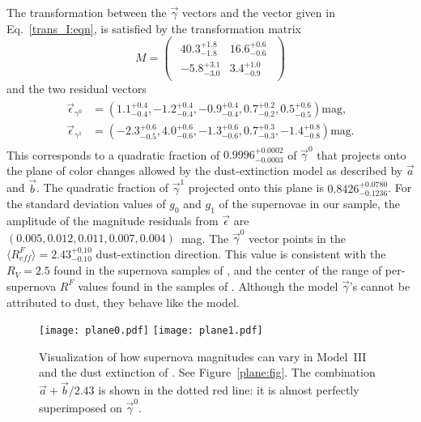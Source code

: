 \documentclass[trackchanges]{aastex62}   	%
\begin{document}
The transformation between the $\vec{\gamma}$  vectors and the    vector given in
Eq.~\ref{trans_I:eqn}, is satisfied by the transformation matrix
\begin{equation}
M=
\begin{pmatrix}
\begin{array}{rr}
40.3^{+1.8}_{-1.8} & 16.6^{+0.6}_{-0.6} \\
-5.8^{+3.1}_{-3.0} & 3.4^{+1.0}_{-0.9}
\end{array}
\end{pmatrix} 
\end{equation}
and the two residual vectors
\begin{align}
\begin{split}
\vec{\epsilon}_{\gamma^0} &=\left(1.1^{+0.4}_{-0.4} , -1.2^{+0.4}_{-0.4} , -0.9^{+0.4}_{-0.4} , 0.7^{+0.2}_{-0.2} , 0.5^{+0.6}_{-0.5}\right) \text{mag}, \\
\vec{\epsilon}_{\gamma^1} & =\left(-2.3^{+0.6}_{-0.5} , 4.0^{+0.6}_{-0.6} , -1.3^{+0.6}_{-0.6} , 0.7^{+0.3}_{-0.3} , -1.4^{+0.8}_{-0.8}\right) \text{mag}.
\end{split}
\label{res_3:eqn}
\end{align}
This corresponds to a quadratic fraction of $0.9996^{+0.0002}_{-0.0003}$ of $\vec{\gamma}^0$ that projects onto the plane of
color changes allowed by the  dust-extinction model
as described by
$\vec{a}$ and $\vec{b}$. The quadratic fraction of $\vec{\gamma}^1$ projected
onto this plane is
$0.8426^{+0.0780}_{-0.1236}$.
For the standard deviation values of $g_0$ and $g_1$ of the supernovae in our sample, the amplitude of the magnitude residuals from $\vec{\epsilon}$ are 
$\left(0.005, 0.012,0.011, 0.007, 0.004 \right)$~mag.
The   $\vec{\gamma}^0$  vector points in the $\langle R^F_{\mathit{eff}}\rangle=2.43^{+0.10}_{-0.10}$ dust-extinction direction.
This value is consistent with the $R_V=2.5$ found in the supernova samples of \citet{2011ApJ...729...55F}, and the
center  of the range of per-supernova $R^F$ values found in the samples of \citet{2014ApJ...789...32B, 2015MNRAS.453.3300A}.
Although the model $\vec{\gamma}$'s cannot be attributed to dust, they behave like the    model.

\begin{figure}[htbp] %
   \centering
   \texttt{[image: plane0.pdf]}
   \texttt{[image: plane1.pdf]}
   \caption{
   Visualization of how supernova magnitudes can vary in Model~III and the dust extinction of .
   See Figure~\ref{plane:fig}.
   The combination $\vec{a}+\vec{b}/2.43$ is shown in the dotted red
   line: it is almost perfectly superimposed on $\vec{\gamma}^0$.
   \label{plane3:fig}}
\end{figure}
\end{document}
